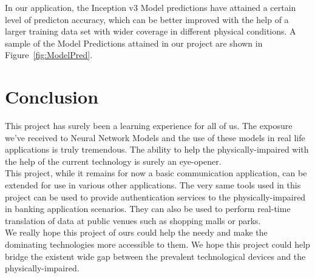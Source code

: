 \documentclass[14pt]{report}
\begin{document}
				In our application, the Inception v3 Model predictions have attained a certain level of predicton accuracy, which can be better improved with the help of a larger training data set with wider coverage in different physical conditions. A sample of the Model Predictions attained in our project are shown in Figure~\ref{fig:ModelPred}.
	\newpage


	\chapter{Conclusion}\label{chapter6}
		
				This project has surely been a learning experience for all of us. The exposure we've received to Neural Network Models and the use of these models in real life applications is truly tremendous. The ability to help the physically-impaired with the help of the current technology is surely an eye-opener.\\

				This project, while it remains for now a basic communication application, can be extended for use in various other applications. The very same tools used in this project can be used to provide authentication services to the physically-impaired in banking application scenarios. They can also be used to perform real-time translation of data at public venues such as shopping malls or parks.\\

				We really hope this project of ours could help the needy and make the dominating technologies more accessible to them. We hope this project could help bridge the existent wide gap between the prevalent technological devices and the physically-impaired.

	\newpage

		
\end{document}
